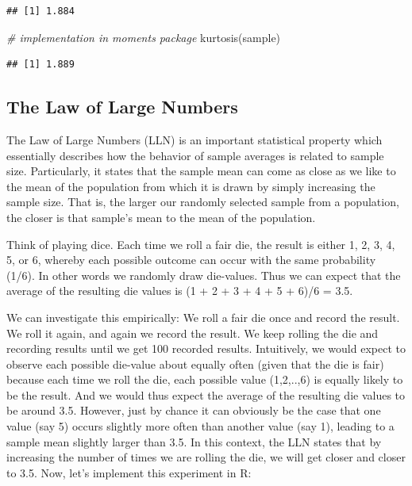 \documentclass[
  12pt,
]{style/krantz}
\newenvironment{Shaded}{\begin{snugshade}}{\end{snugshade}}
\newcommand{\CommentTok}[1]{\textcolor[rgb]{0.56,0.35,0.01}{\textit{#1}}}
\newcommand{\FunctionTok}[1]{\textcolor[rgb]{0.00,0.00,0.00}{#1}}
\newcommand{\NormalTok}[1]{#1}
\begin{document}
\begin{verbatim}
## [1] 1.884
\end{verbatim}

\begin{Shaded}
\begin{Highlighting}[]
\CommentTok{\# implementation in moments package}
\FunctionTok{kurtosis}\NormalTok{(sample)}
\end{Highlighting}
\end{Shaded}

\begin{verbatim}
## [1] 1.889
\end{verbatim}

\hypertarget{the-law-of-large-numbers}{%
\subsection{The Law of Large Numbers}\label{the-law-of-large-numbers}}

The Law of Large Numbers (LLN) is an important statistical property which essentially describes how the behavior of sample averages is related to sample size. Particularly, it states that the sample mean can come as close as we like to the mean of the population from which it is drawn by simply increasing the sample size. That is, the larger our randomly selected sample from a population, the closer is that sample's mean to the mean of the population.

Think of playing dice. Each time we roll a fair die, the result is either 1, 2, 3, 4, 5, or 6, whereby each possible outcome can occur with the same probability (1/6). In other words we randomly draw die-values. Thus we can expect that the average of the resulting die values is (1 + 2 + 3 + 4 + 5 + 6)/6 = 3.5.

We can investigate this empirically: We roll a fair die once and record the result. We roll it again, and again we record the result. We keep rolling the die and recording results until we get 100 recorded results. Intuitively, we would expect to observe each possible die-value about equally often (given that the die is fair) because each time we roll the die, each possible value (1,2,..,6) is equally likely to be the result. And we would thus expect the average of the resulting die values to be around 3.5. However, just by chance it can obviously be the case that one value (say 5) occurs slightly more often than another value (say 1), leading to a sample mean slightly larger than 3.5. In this context, the LLN states that by increasing the number of times we are rolling the die, we will get closer and closer to 3.5. Now, let's implement this experiment in R:
\end{document}
